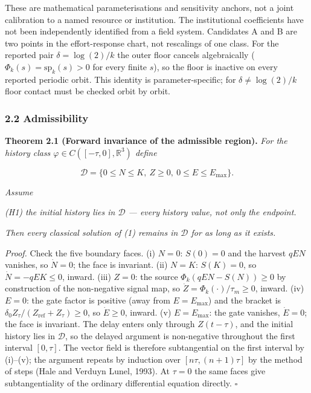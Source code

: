 \documentclass[11pt]{article}
\begin{document}
These are mathematical parameterisations and sensitivity anchors, not a
joint calibration to a named resource or institution. The institutional
coefficients have not been independently identified from a field system.
Candidates A and B are two points in the effort-response chart, not
rescalings of one class. For the reported pair \(\delta = \log(2)/k\)
the outer floor cancels algebraically
(\(\Phi_k(s) = \mathrm{sp}_k(s) > 0\) for every finite \(s\)), so the
floor is inactive on every reported periodic orbit. This identity is
parameter-specific; for \(\delta \ne \log(2)/k\) floor contact must be
checked orbit by orbit.

\subsubsection{2.2 Admissibility}\label{admissibility}

\textbf{Theorem 2.1 (Forward invariance of the admissible region).}
\emph{For the history class \(\varphi \in C([-\tau, 0], \mathbb{R}^3)\)
define}

\[\mathcal{D} = \{ 0 \le N \le K,\ Z \ge 0,\ 0 \le E \le E_{\max} \}.\]

\emph{Assume}

\emph{(H1) the initial history lies in \(\mathcal{D}\) --- every history
value, not only the endpoint.}

\emph{Then every classical solution of (1) remains in \(\mathcal{D}\)
for as long as it exists.}

\emph{Proof.} Check the five boundary faces. (i) \(N = 0\): \(S(0) = 0\)
and the harvest \(qEN\) vanishes, so \(\dot N = 0\); the face is
invariant. (ii) \(N = K\): \(S(K) = 0\), so \(\dot N = -qEK \le 0\),
inward. (iii) \(Z = 0\): the source \(\Phi_k(qEN - S(N)) \ge 0\) by
construction of the non-negative signal map, so
\(\dot Z = \Phi_k(\cdot)/\tau_m \ge 0\), inward. (iv) \(E = 0\): the
gate factor is positive (away from \(E = E_{\max}\)) and the bracket is
\(\delta_0 Z_\tau/(Z_{\mathrm{ref}} + Z_\tau) \ge 0\), so
\(\dot E \ge 0\), inward. (v) \(E = E_{\max}\): the gate vanishes,
\(\dot E = 0\); the face is invariant. The delay enters only through
\(Z(t - \tau)\), and the initial history lies in \(\mathcal{D}\), so the
delayed argument is non-negative throughout the first interval
\([0, \tau]\). The vector field is therefore subtangential on the first
interval by (i)--(v); the argument repeats by induction over
\([n\tau, (n+1)\tau]\) by the method of steps (Hale and Verduyn Lunel,
1993). At \(\tau = 0\) the same faces give subtangentiality of the
ordinary differential equation directly. \ensuremath{\square}
\end{document}
